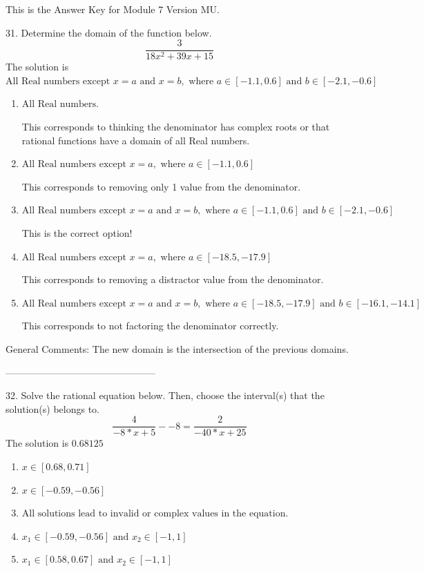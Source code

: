 \documentclass{article}[10pt]
\begin{document}
This is the Answer Key for Module 7 Version MU.

31. Determine the domain of the function below.
$$ \frac{3}{18 x^2 + 39 x + 15} $$ 
The solution is $ \text{All Real numbers except } x = a \text{ and } x = b, \text{ where } a \in [-1.1, 0.6] \text{ and } b \in [-2.1, -0.6] $ 

\begin{enumerate}[label=\Alph*.] 
\item $ \text{All Real numbers.} $ 

 This corresponds to thinking the denominator has complex roots or that rational functions have a domain of all Real numbers. 
\item $ \text{All Real numbers except } x = a, \text{ where } a \in [-1.1, 0.6] $ 

 This corresponds to removing only 1 value from the denominator. 
\item $ \text{All Real numbers except } x = a \text{ and } x = b, \text{ where } a \in [-1.1, 0.6] \text{ and } b \in [-2.1, -0.6] $ 

 This is the correct option! 
\item $ \text{All Real numbers except } x = a, \text{ where } a \in [-18.5, -17.9] $ 

 This corresponds to removing a distractor value from the denominator. 
\item $ \text{All Real numbers except } x = a \text{ and } x = b, \text{ where } a \in [-18.5, -17.9] \text{ and } b \in [-16.1, -14.1] $ 

 This corresponds to not factoring the denominator correctly. 
\end{enumerate} 
 
General Comments: The new domain is the intersection of the previous domains.

-----------------------------------------------

32. Solve the rational equation below. Then, choose the interval(s) that the solution(s) belongs to.
$$ \frac{4}{-8*x + 5} - -8 = \frac{2}{-40*x + 25} $$ 
The solution is $ 0.68125 $ 

\begin{enumerate}[label=\Alph*.] 
\item $ x \in [0.68,0.71] $ 

  
\item $ x \in [-0.59,-0.56] $ 

  
\item $ \text{All solutions lead to invalid or complex values in the equation.} $ 

  
\item $ x_1 \in [-0.59, -0.56] \text{ and } x_2 \in [-1,1] $ 

  
\item $ x_1 \in [0.58, 0.67] \text{ and } x_2 \in [-1,1] $ 

  
\end{enumerate} 
 
\end{document}
